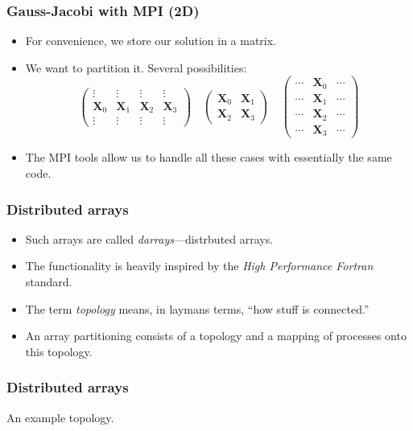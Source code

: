 \begin{frame}
  \frametitle{Gauss-Jacobi with MPI (2D)}
  \begin{itemize}
  \item For convenience, we store our solution in a matrix.
  \item We want to partition it. Several possibilities:
    \[
      \begin{pmatrix}
        \vdots & \vdots & \vdots & \vdots \\
        \bm X_0 & \bm X_1 & \bm X_2 & \bm X_3 \\
        \vdots & \vdots & \vdots & \vdots
      \end{pmatrix}
      \quad
      \begin{pmatrix}
        \bm X_0 & \bm X_1 \\
        \bm X_2 & \bm X_3
      \end{pmatrix}
      \quad
      \begin{pmatrix}
        \cdots & \bm X_0 & \cdots \\
        \cdots & \bm X_1 & \cdots \\
        \cdots & \bm X_2 & \cdots \\
        \cdots & \bm X_3 & \cdots
      \end{pmatrix}
    \]
  \item The MPI tools allow us to handle all these cases with essentially the
    same code.
  \end{itemize}
\end{frame}

\begin{frame}
  \frametitle{Distributed arrays}
  \begin{itemize}
  \item Such arrays are called \emph{darrays}---distrbuted arrays.
  \item The functionality is heavily inspired by the \emph{High Performance
      Fortran} standard.
  \item The term \emph{topology} means, in laymans terms, ``how stuff is
    connected.''
  \item An array partitioning consists of a topology and a mapping of processes
    onto this topology.
  \end{itemize}
\end{frame}

\begin{frame}
  \frametitle{Distributed arrays}
  An example topology.
  \begin{center}
  \end{center}
\end{frame}

